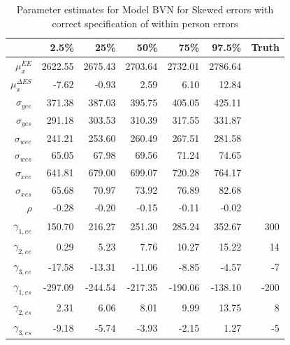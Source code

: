 \documentclass[11pt]{article}\usepackage[]{graphicx}\usepackage[]{color}
\begin{document}
\begin{table}[ht]
\centering
\begin{tabular}{rrrrrr|r}
  \hline
 & 2.5\% & 25\% & 50\% & 75\% & 97.5\% & Truth\\
  \hline
$\mu_x^{EE}$ & 2622.55 & 2675.43 & 2703.64 & 2732.01 & 2786.64 \\ 
  $\mu_x^{\Delta ES}$ & -7.62 & -0.93 & 2.59 & 6.10 & 12.84 \\ 
  $\sigma_{yee}$ & 371.38 & 387.03 & 395.75 & 405.05 & 425.11 \\ 
  $\sigma_{yes}$ & 291.18 & 303.53 & 310.39 & 317.55 & 331.87 \\ 
  $\sigma_{wee}$ & 241.21 & 253.60 & 260.49 & 267.51 & 281.58 \\ 
  $\sigma_{wes}$ & 65.05 & 67.98 & 69.56 & 71.24 & 74.65 \\ 
  $\sigma_{xee}$ & 641.81 & 679.00 & 699.07 & 720.28 & 764.17 \\ 
  $\sigma_{xes}$ & 65.68 & 70.97 & 73.92 & 76.89 & 82.68 \\ 
  $\rho$ & -0.28 & -0.20 & -0.15 & -0.11 & -0.02 \\ 
  $\gamma_{1,ee}$ & 150.70 & 216.27 & 251.30 & 285.24 & 352.67 & 300 \\ 
  $\gamma_{2,ee}$ & 0.29 & 5.23 & 7.76 & 10.27 & 15.22 & 14\\ 
  $\gamma_{3,ee}$ & -17.58 & -13.31 & -11.06 & -8.85 & -4.57 & -7 \\ 
  $\gamma_{1,es}$ & -297.09 & -244.54 & -217.35 & -190.06 & -138.10 & -200 \\ 
  $\gamma_{2,es}$ & 2.31 & 6.06 & 8.01 & 9.99 & 13.75 & 8\\ 
  $\gamma_{3,es}$ & -9.18 & -5.74 & -3.93 & -2.15 & 1.27 & -5 \\ 
   \hline
\end{tabular}
\caption{Parameter estimates for Model BVN for Skewed errors with correct specification of within person errors}
\label{mbvnswpestimates}
\end{table}
\end{document}
